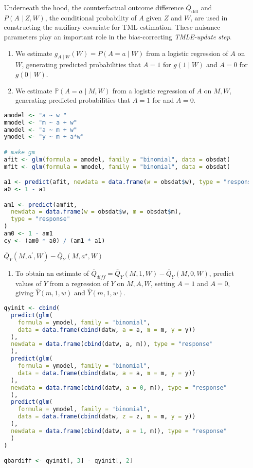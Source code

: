 \documentclass[
  12pt,
]{book}
\providecommand{\tightlist}{%
  \setlength{\itemsep}{0pt}\setlength{\parskip}{0pt}}
\theoremstyle{definition}
\theoremstyle{definition}
\theoremstyle{definition}
\renewcommand{\P}{\mathbb{P}}
\newcommand{\1}{\mathbbm{1}}
\begin{document}
Underneath the hood, the counterfactual outcome difference
\(\bar{Q}_{\text{diff}}\) and \(P(A \mid Z, W)\), the conditional probability of \(A\)
given \(Z\) and \(W\), are used in constructing the auxiliary covariate for TML
estimation. These nuisance parameters play an important role in the
bias-correcting \emph{TMLE-update step}.

\begin{enumerate}
\def\labelenumi{\arabic{enumi}.}
\tightlist
\item
  We estimate \(g_{A \mid W}(W)=P(A=a \mid W)\) from a logistic regression of
  \(A\) on \(W\), generating predicted probabilities that \(A=1\) for \(g(1 \mid W)\)
  and \(A=0\) for \(g(0 \mid W)\).\\
\item
  We estimate \(\P(A=a \mid M, W)\) from a logistic regression of \(A\) on \(M, W\),
  generating predicted probabilities that \(A=1\) for and \(A=0\).
\end{enumerate}

\begin{lstlisting}[language=R]
amodel <- "a ~ w "
mmodel <- "m ~ a + w"
amodel <- "a ~ m + w"
ymodel <- "y ~ m + a*w"

# make gm
afit <- glm(formula = amodel, family = "binomial", data = obsdat)
mfit <- glm(formula = mmodel, family = "binomial", data = obsdat)

a1 <- predict(afit, newdata = data.frame(w = obsdat$w), type = "response")
a0 <- 1 - a1

am1 <- predict(amfit,
  newdata = data.frame(w = obsdat$w, m = obsdat$m),
  type = "response"
)
am0 <- 1 - am1
cy <- (am0 * a0) / (am1 * a1)
\end{lstlisting}

\(\bar{Q}_Y(M,a^\prime,W) - \bar{Q}_Y(M,a^\star,W)\)

\begin{enumerate}
\def\labelenumi{\arabic{enumi}.}
\setcounter{enumi}{2}
\tightlist
\item
  To obtain an estimate of \(\bar{Q}_{diff} = \bar{Q}_Y(M,1,W) - \bar{Q}_Y(M,0,W)\), predict values of \(Y\) from a regression of \(Y\) on \(M,A,W\),
  setting \(A=1\) and \(A=0\), giving \(\hat{Y}(m, 1, w)\) and \(\hat{Y}(m, 1, w)\).
\end{enumerate}

\begin{lstlisting}[language=R]
qyinit <- cbind(
  predict(glm(
    formula = ymodel, family = "binomial",
    data = data.frame(cbind(datw, a = a, m = m, y = y))
  ),
  newdata = data.frame(cbind(datw, a, m)), type = "response"
  ),
  predict(glm(
    formula = ymodel, family = "binomial",
    data = data.frame(cbind(datw, a = a, m = m, y = y))
  ),
  newdata = data.frame(cbind(datw, a = 0, m)), type = "response"
  ),
  predict(glm(
    formula = ymodel, family = "binomial",
    data = data.frame(cbind(datw, z = z, m = m, y = y))
  ),
  newdata = data.frame(cbind(datw, a = 1, m)), type = "response"
  )
)

qbardiff <- qyinit[, 3] - qyinit[, 2]
\end{lstlisting}
\end{document}
